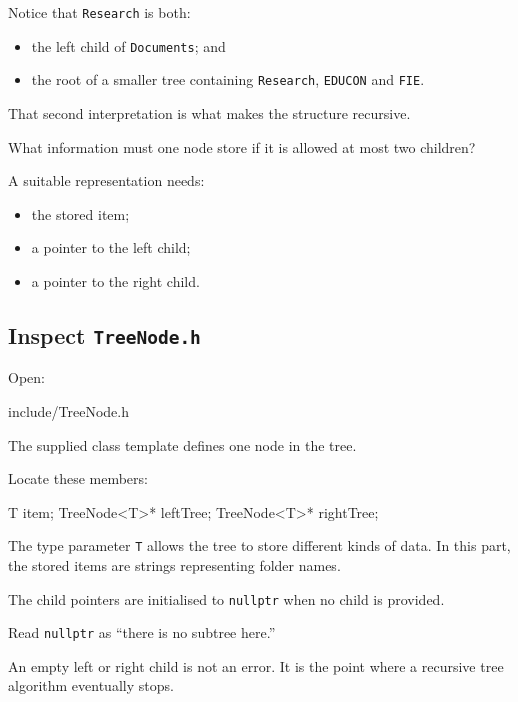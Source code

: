\documentclass{csc2059practical}
\begin{document}
Notice that \texttt{Research} is both:

\begin{itemize}
    \item the left child of \texttt{Documents}; and
    \item the root of a smaller tree containing \texttt{Research},
          \texttt{EDUCON} and \texttt{FIE}.
\end{itemize}

That second interpretation is what makes the structure recursive.

\begin{engineeringquestion}
What information must one node store if it is allowed at most two children?
\end{engineeringquestion}

A suitable representation needs:

\begin{itemize}
    \item the stored item;
    \item a pointer to the left child;
    \item a pointer to the right child.
\end{itemize}

\subsection{Inspect \texttt{TreeNode.h}}

Open:

\begin{terminal}
include/TreeNode.h
\end{terminal}

The supplied class template defines one node in the tree.

Locate these members:

\begin{cppcode}
T item;
TreeNode<T>* leftTree;
TreeNode<T>* rightTree;
\end{cppcode}

The type parameter \texttt{T} allows the tree to store different kinds
of data. In this part, the stored items are strings representing folder names.

The child pointers are initialised to \texttt{nullptr} when no child is
provided.

\begin{tipbox}
Read \texttt{nullptr} as ``there is no subtree here.''

An empty left or right child is not an error. It is the point where a recursive
tree algorithm eventually stops.
\end{tipbox}
\end{document}
